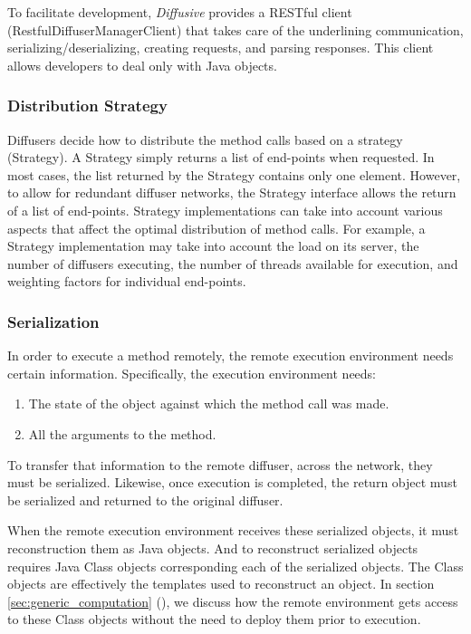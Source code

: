 \documentclass[11pt]{scrartcl}
\begin{document}
To facilitate development, \emph{Diffusive} provides a RESTful client (\textsf{RestfulDiffuserManagerClient}) that takes care of the underlining communication, serializing/deserializing, creating requests, and parsing responses. This client allows developers to deal only with Java objects.

\subsubsection{Distribution Strategy\label{sec:distribution_strategy}}
Diffusers decide how to distribute the method calls based on a strategy (\textsf{Strategy}). A \textsf{Strategy} simply returns a list of end-points when requested. In most cases, the list returned by the \textsf{Strategy} contains only one element. However, to allow for redundant diffuser networks, the \textsf{Strategy} interface allows the return of a list of end-points. \textsf{Strategy} implementations can take into account various aspects that affect the optimal distribution of method calls. For example, a \textsf{Strategy} implementation may take into account the load on its server, the number of diffusers executing, the number of threads available for execution, and weighting factors for individual end-points.

\subsubsection{Serialization\label{sec:serialization}}
In order to execute a method remotely, the remote execution environment needs certain information. Specifically, the execution environment needs:
\begin{enumerate}
\item The state of the object against which the method call was made.
\item All the arguments to the method.
\end{enumerate}
To transfer that information to the remote diffuser, across the network, they must be serialized. Likewise, once execution is completed, the return object must be serialized and returned to the original diffuser.

When the remote execution environment receives these serialized objects, it must reconstruction them as Java objects. And to reconstruct serialized objects requires Java \textsf{Class} objects corresponding each of the serialized objects. The \textsf{Class} objects are effectively the templates used to reconstruct an object. In section \ref{sec:generic_computation} (), we discuss how the remote environment gets access to these \textsf{Class} objects without the need to deploy them prior to execution.
\end{document}
